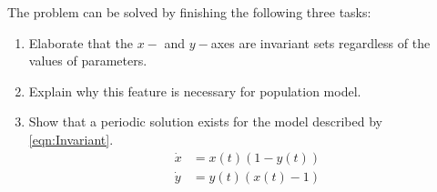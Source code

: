 The problem can be solved by finishing the following three tasks:
\begin{enumerate}
  \item Elaborate that the $x-$ and $y-$axes are invariant sets regardless of the values of parameters.
  \item Explain why this feature is necessary for population model.
  \item Show that a periodic solution exists for the model described by \eqref{eqn:Invariant}.
  \begin{subequations}\label{eqn:Invariant}
\begin{align} 
\dot{x}&=x(t)(1-y(t))\label{eqn:Invariant1}\\
\dot{y}&=y(t)(x(t)-1)\label{eqn:Invariant2}
\end{align}
\end{subequations}
\end{enumerate}